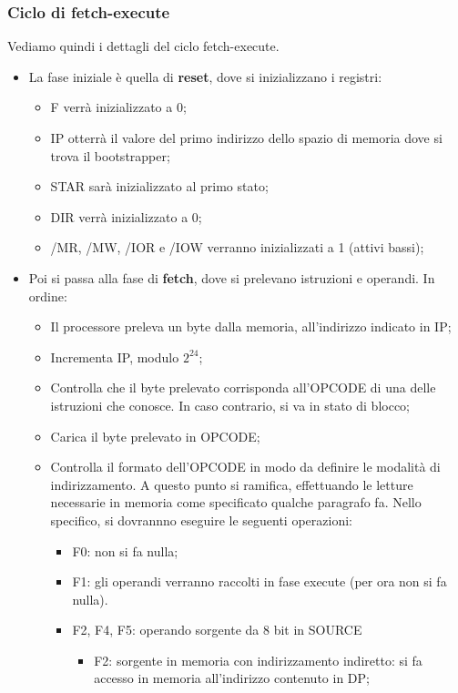 \documentclass[a4paper,11pt]{article}
\begin{document}
\subsubsection{Ciclo di fetch-execute}
Vediamo quindi i dettagli del ciclo fetch-execute.
\begin{itemize}
	\item La fase iniziale è quella di \textbf{reset}, dove si inizializzano i registri:
		\begin{itemize}
			\item F verrà inizializzato a 0;
			\item IP otterrà il valore del primo indirizzo dello spazio di memoria dove si trova il bootstrapper;
			\item STAR sarà inizializzato al primo stato;
			\item DIR verrà inizializzato a 0;
			\item /MR, /MW, /IOR e /IOW verranno inizializzati a 1 (attivi bassi);
		\end{itemize}
	\item Poi si passa alla fase di \textbf{fetch}, dove si prelevano istruzioni e operandi. In ordine:
		\begin{itemize}
			\item Il processore preleva un byte dalla memoria, all'indirizzo indicato in IP;
			\item Incrementa IP, modulo $2^{24}$;
			\item Controlla che il byte prelevato corrisponda all'OPCODE di una delle istruzioni che conosce.
				In caso contrario, si va in stato di blocco;
			\item Carica il byte prelevato in OPCODE;
			\item Controlla il formato dell'OPCODE in modo da definire le modalità di indirizzamento.
				A questo punto si ramifica, effettuando le letture necessarie in memoria come specificato qualche paragrafo fa. Nello specifico, si dovrannno eseguire le seguenti operazioni:
				\begin{itemize}
			\item F0: non si fa nulla;
			\item F1: gli operandi verranno raccolti in fase execute (per ora non si fa nulla).
					\item F2, F4, F5: operando sorgente da 8 bit in SOURCE
						\begin{itemize}
							\item F2: sorgente in memoria con indirizzamento indiretto: si fa accesso in memoria all'indirizzo contenuto in DP;

\end{itemize}
\end{itemize}
\end{itemize}
\end{itemize}
\end{document}
